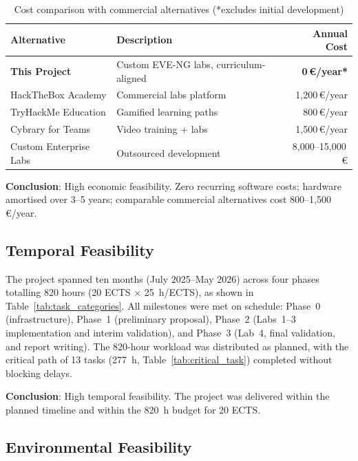 \begin{table}[H]
  \centering
  \small
  \setlength{\tabcolsep}{4pt}
  \renewcommand{\arraystretch}{1.1}
  \begin{tabularx}{\textwidth}{lXr}
    \toprule
    \textbf{Alternative} & \textbf{Description} & \textbf{Annual Cost} \\
    \midrule
    \textbf{This Project} & Custom EVE-NG labs, curriculum-aligned & \textbf{0\,\euro/year*} \\
    HackTheBox Academy    & Commercial labs platform               & 1{,}200\,\euro/year \\
    TryHackMe Education   & Gamified learning paths               & 800\,\euro/year     \\
    Cybrary for Teams     & Video training + labs                 & 1{,}500\,\euro/year \\
    Custom Enterprise Labs& Outsourced development                & 8{,}000--15{,}000\,\euro \\
    \bottomrule
  \end{tabularx}
  \caption[Cost comparison]{Cost comparison with commercial alternatives (*excludes initial development)}
  \label{tab:cost_comparison}
\end{table}

\textbf{Conclusion}: High economic feasibility. Zero recurring software costs; hardware
amortised over 3--5 years; comparable commercial alternatives cost 800--1{,}500\,\euro/year.


\subsection{Temporal Feasibility}

The project spanned ten months (July 2025--May 2026) across four phases totalling
820 hours (20 ECTS $\times$ 25~h/ECTS), as shown in Table~\ref{tab:task_categories}.
All milestones were met on schedule: Phase~0 (infrastructure), Phase~1
(preliminary proposal), Phase~2 (Labs~1--3 implementation and interim
validation), and Phase~3 (Lab~4, final validation, and report writing).
The 820-hour workload was distributed as planned, with the critical path of
13 tasks (277~h, Table~\ref{tab:critical_task}) completed without blocking delays.

\textbf{Conclusion}: High temporal feasibility. The project was delivered
within the planned timeline and within the 820~h budget for 20 ECTS.

\subsection{Environmental Feasibility}


